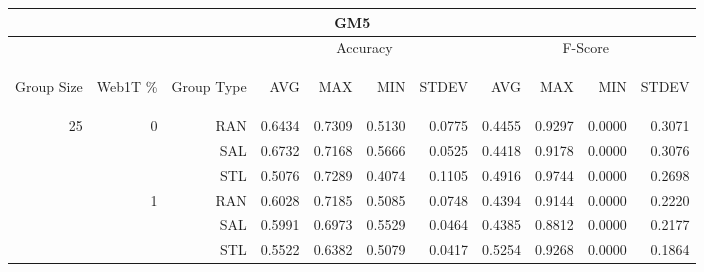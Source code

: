 \begin{center}
\begin{table}[htbp]
\begin{tabular}{ | r | r | r | r | r | r | r | r | r | r | r |}
\hline
\multicolumn{11}{|c|}{GM5}\\
\hline
 & & & \multicolumn{4}{|c|}{Accuracy} & \multicolumn{4}{|c|}{F-Score}\\ \cline{4-11}
\begin{sideways}Group Size\end{sideways} & \begin{sideways}Web1T \%\end{sideways} & \begin{sideways}Group Type\end{sideways} & \begin{sideways}AVG\end{sideways} & \begin{sideways}MAX\end{sideways} & \begin{sideways}MIN\end{sideways} & \begin{sideways}STDEV\end{sideways} & \begin{sideways}AVG\end{sideways} & \begin{sideways}MAX\end{sideways} & \begin{sideways}MIN\end{sideways} & \begin{sideways}STDEV\end{sideways}\\
\hline
\multirow{18}{*}{25}
 & \multirow{3}{*}{0} & RAN & 0.6434 & 0.7309 & 0.5130 & 0.0775 & 0.4455 & 0.9297 & 0.0000 & 0.3071\\ \cline{3-11}
 &   & SAL & 0.6732 & 0.7168 & 0.5666 & 0.0525 & 0.4418 & 0.9178 & 0.0000 & 0.3076\\ \cline{3-11}
 &   & STL & 0.5076 & 0.7289 & 0.4074 & 0.1105 & 0.4916 & 0.9744 & 0.0000 & 0.2698\\ \cline{2-11}
 & \multirow{3}{*}{1} & RAN & 0.6028 & 0.7185 & 0.5085 & 0.0748 & 0.4394 & 0.9144 & 0.0000 & 0.2220\\ \cline{3-11}
 &   & SAL & 0.5991 & 0.6973 & 0.5529 & 0.0464 & 0.4385 & 0.8812 & 0.0000 & 0.2177\\ \cline{3-11}
 &   & STL & 0.5522 & 0.6382 & 0.5079 & 0.0417 & 0.5254 & 0.9268 & 0.0000 & 0.1864\\ \cline{2-11}

\end{tabular}
\end{table}
\end{center}
